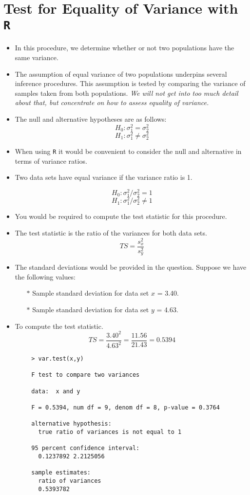 \documentclass[a4paper,12pt]{article}
\begin{document}
	
\section*{Test for Equality of Variance with \texttt{R}}
	\begin{itemize}
		\item In this procedure, we determine whether or not two populations have the same variance.
		\item The assumption of equal variance of two populations underpins several inference procedures. This assumption is tested by comparing the variance of samples taken from both populations.
\textit{ We will not get into too much detail about that, but concentrate on how to assess equality of variance.}
		\item The null and alternative hypotheses are as follows:
		\[ H_0: \sigma^2_1 = \sigma^2_2 \]
		\[ H_1: \sigma^2_1 \neq \sigma^2_2 \]

		\item When using \texttt{R} it would be convenient to consider the null and alternative in terms of variance ratios.
		\item Two data sets have equal variance if the variance ratio is 1.

	\[ H_0: \sigma^2_1 / \sigma^2_2 = 1 \]
	\[ H_1: \sigma^2_1 / \sigma^2_2 \neq 1 \]
	

\item You would be required to compute the test statistic for this procedure.
\item The test statistic is the ratio of the variances for both data sets.
	\[ TS = \frac{s^2_x}{s^2_y} \]
\item The standard deviations would be provided in the question. Suppose we have the following values: \begin{itemize}
		\item[$\ast$] Sample standard deviation for data set $x$ = 3.40.
		\item[$\ast$] Sample standard deviation for data set $y$ = 4.63.
	\end{itemize}
\item To compute the test statistic.
	\[ TS = \frac{3.40^2}{4.63^2} = \frac{11.56}{21.43} = 0.5394 \]
		\end{itemize}
\newpage
	\begin{framed}
		\begin{verbatim}
		> var.test(x,y)
		
		F test to compare two variances
		
		data:  x and y
		
		F = 0.5394, num df = 9, denom df = 8, p-value = 0.3764
		
		alternative hypothesis: 
		  true ratio of variances is not equal to 1
		
		95 percent confidence interval:
		  0.1237892 2.2125056
		
		sample estimates:
		  ratio of variances
		  0.5393782
		\end{verbatim}
	\end{framed}		
	
\end{document}
